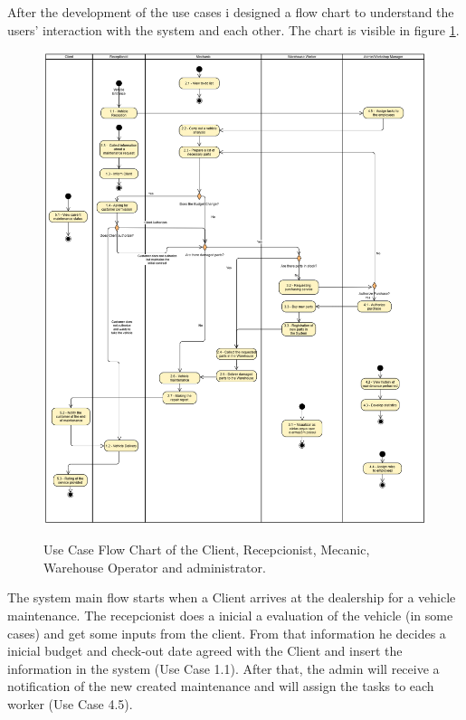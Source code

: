 After the development of the use cases i designed a flow chart to understand the users' interaction with the system and each other. The chart is visible in figure \ref{fig:figure2}.

\begin{figure}[h]
  \caption{Use Case Flow Chart of the Client, Recepcionist, Mecanic, Warehouse Operator and administrator.}
  \centering
  \includegraphics[width=\textwidth]{figs/UseCaseDiagram}
  \label{fig:figure2}
\end{figure}

The system main flow starts when a Client arrives at the dealership for a vehicle maintenance. 
The recepcionist does a inicial a evaluation of the vehicle (in some cases) and get some inputs from the client. 
From that information he decides a inicial budget and check-out date agreed with the Client and insert the information in the system (Use Case 1.1).
After that, the admin will receive a notification of the new created maintenance and will assign the tasks to each worker (Use Case 4.5).

